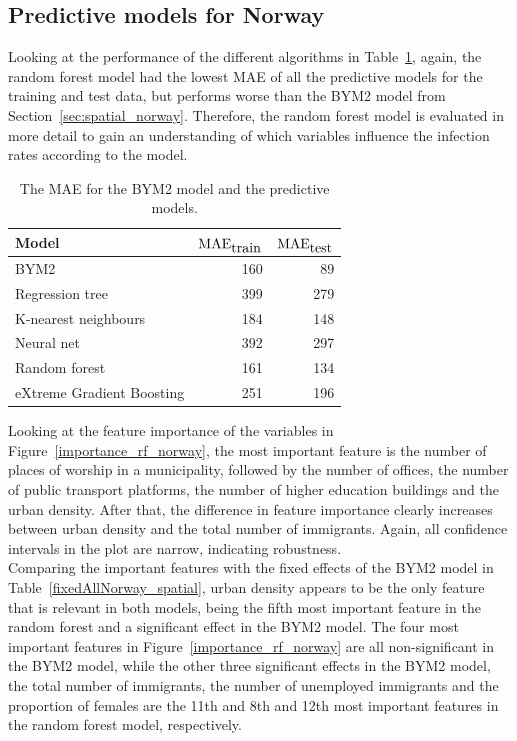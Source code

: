 \subsection{Predictive models for Norway}
Looking at the performance of the different algorithms in Table~\ref{pred_perf_norway}, again, the random forest model had the lowest MAE of all the predictive models for the training and test data, but performs worse than the BYM2 model from Section~\ref{sec:spatial_norway}. Therefore, the random forest model is evaluated in more detail to gain an understanding of which variables influence the infection rates according to the model.
\begin{table}[H] 
\caption{The MAE for the BYM2 model and the predictive models. \label{pred_perf_norway}}
\begin{tabular}{l r r}
\toprule
\textbf{Model}	& \textbf{$\hbox{MAE}_{\hbox{train}}$} & \textbf{$\hbox{MAE}_{\hbox{test}}$}\\
\midrule
BYM2 & 160 & 89\\
Regression tree & 399 & 279 \\
K-nearest neighbours & 184 & 148 \\
Neural net & 392 & 297 \\
Random forest & 161 & 134 \\
eXtreme Gradient Boosting & 251 & 196 \\
\bottomrule
\end{tabular}
\end{table}
Looking at the feature importance of the variables in Figure~\ref{importance_rf_norway}, the most important feature is the number of places of worship in a municipality, followed by the number of offices, the number of public transport platforms, the number of higher education buildings and the urban density. After that, the difference in feature importance clearly increases between urban density and the total number of immigrants. Again, all confidence intervals in the plot are narrow, indicating robustness. \\
Comparing the important features with the fixed effects of the BYM2 model in Table~\ref{fixedAllNorway_spatial}, urban density appears to be the only feature that is relevant in both models, being the fifth most important feature in the random forest and a significant effect in the BYM2 model. The four most important features in Figure~\ref{importance_rf_norway} are all non-significant in the BYM2 model, while the other three significant effects in the BYM2 model, the total number of immigrants, the number of unemployed immigrants and the proportion of females are the 11th and 8th and 12th most important features in the random forest model, respectively.
